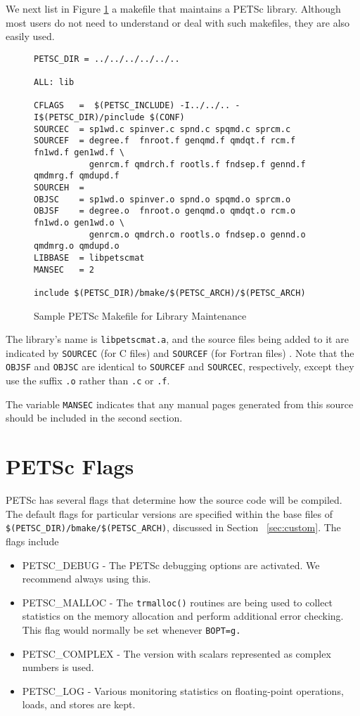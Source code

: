 We next list in Figure \ref{fig:make2} a makefile that maintains a PETSc 
library.  Although most users do not need to understand or deal with such
makefiles, they are also easily used.

\begin{figure}[H]
\begin{verbatim}
PETSC_DIR = ../../../../../..

ALL: lib

CFLAGS   =  $(PETSC_INCLUDE) -I../../.. -I$(PETSC_DIR)/pinclude $(CONF)
SOURCEC  = sp1wd.c spinver.c spnd.c spqmd.c sprcm.c
SOURCEF  = degree.f  fnroot.f genqmd.f qmdqt.f rcm.f fn1wd.f gen1wd.f \
           genrcm.f qmdrch.f rootls.f fndsep.f gennd.f qmdmrg.f qmdupd.f
SOURCEH  = 
OBJSC    = sp1wd.o spinver.o spnd.o spqmd.o sprcm.o
OBJSF    = degree.o  fnroot.o genqmd.o qmdqt.o rcm.o fn1wd.o gen1wd.o \
           genrcm.o qmdrch.o rootls.o fndsep.o gennd.o qmdmrg.o qmdupd.o
LIBBASE  = libpetscmat
MANSEC   = 2

include $(PETSC_DIR)/bmake/$(PETSC_ARCH)/$(PETSC_ARCH)
\end{verbatim}
\caption{Sample PETSc Makefile for Library Maintenance}
\label{fig:make2}
\end{figure}

The library's name is {\tt libpetscmat.a}, and the source files being added
to it are indicated by {\tt SOURCEC} (for C files) and {\tt SOURCEF} (for 
Fortran files) . Note that the {\tt OBJSF} and {\tt OBJSC} are identical 
to {\tt SOURCEF} and {\tt SOURCEC}, respectively, except they use the
suffix {\tt .o} rather than {\tt .c} or {\tt .f}. 

The variable {\tt MANSEC} indicates that any manual pages generated
from this source should be included in the second section. 

\section{PETSc Flags}

PETSc has several flags that determine how the source code will be compiled.
The default flags for particular versions are specified within the base 
files of {\tt \$(PETSC\_DIR)/bmake/\$(PETSC\_ARCH)}, discussed in 
Section ~\ref{sec:custom}.  The flags include
\begin{itemize}
\item PETSC\_DEBUG - The PETSc debugging options are activated. We 
      recommend always using this. 
\item PETSC\_MALLOC - The {\tt trmalloc()} routines are being used to 
      collect statistics on the memory allocation and perform additional
      error checking. This flag would normally be set whenever {\tt BOPT=g.}
      \findex{PETSC_MALLOC}
\item PETSC\_COMPLEX - The version with scalars represented 
      as complex numbers is used. 
\item PETSC\_LOG - Various monitoring statistics on floating-point operations,
      loads, and stores are kept. \findex{PETSC_LOG}
\end{itemize}

